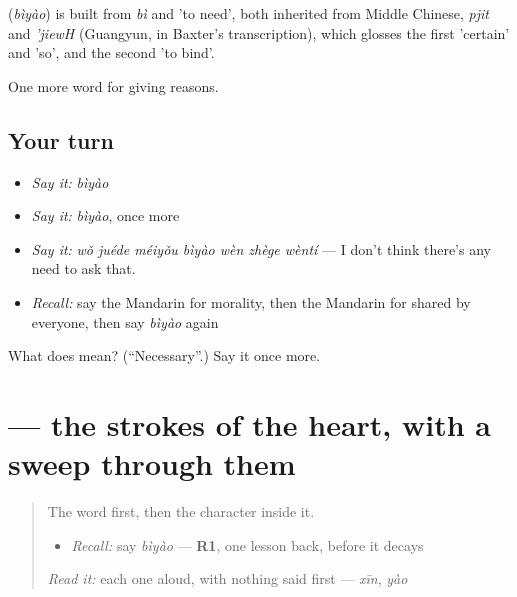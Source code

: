 \begin{cousinweb}
\textbf{} (\emph{bìyào}) is built from \emph{bì} and  'to need', both inherited from Middle Chinese, \emph{pjit} and \emph{'jiewH} (Guangyun, in Baxter's transcription), which glosses the first 'certain' and 'so', and the second 'to bind'.
\end{cousinweb}

\begin{grammarlens}[title={What you've built}]
One more word for giving reasons.
\end{grammarlens}

\subsection*{Your turn}
\begin{itemize}
\raggedright
  \item \emph{Say it:} \emph{bìyào}
  \item \emph{Say it:} \emph{bìyào}, once more
  \item \emph{Say it:} \emph{wǒ juéde méiyǒu bìyào wèn zhège wèntí} — I don't think there's any need to ask that.
  \item \emph{Recall:} say the Mandarin for morality, then the Mandarin for shared by everyone, then say \emph{bìyào} again
\end{itemize}

\begin{tcolorbox}[breakable,colback=teal!4,colframe=teal!35!black,title={Before you move on}]
What does  mean? (\textquotedblleft{}Necessary\textquotedblright{}.) Say it once more.
\end{tcolorbox}
\section[\texorpdfstring{\zh{必} (bì)}{必 (bì)}]{ — the strokes of the heart, with a sweep through them}

\label{lesson:ZH-W360-bi-must}



\begin{quote}
The word first, then the character inside it.

\begin{itemize}
\raggedright
  \item \emph{Recall:} say \emph{bìyào} — \textbf{R1}, one lesson back, before it decays
\end{itemize}

\begin{quote}
 
\end{quote}

\emph{Read it:} each one aloud, with nothing said first — \emph{xīn}, \emph{yào}
\end{quote}

